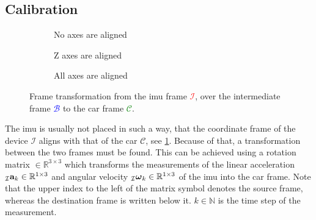 \subsection{Calibration}
\label{ssec:calibration_imu}
\begin{figure}[htb]
    \centering
    \begin{subfigure}[b]{0.3\textwidth}
        \centering
        
        \caption{No axes are aligned}
        \label{fig:tikz_frame_transformation_init}
    \end{subfigure}
    \hfill
    \begin{subfigure}[b]{0.3\textwidth}
        \centering
        
        \caption{Z axes are aligned}
        \label{fig:tikz_frame_transformation_intermediate}
    \end{subfigure}
    \hfill
    \begin{subfigure}[b]{0.3\textwidth}
        \centering
        
        \caption{All axes are aligned}
        \label{fig:tikz_frame_transformation_final}
    \end{subfigure}
    \caption[Frame transformation]{Frame transformation from the \gls{imu} frame \textcolor{red}{$\mathcal{I}$}, over the intermediate frame \textcolor{blue}{$\mathcal{B}$} to the car frame \textcolor{green}{$\mathcal{C}$}.}
    \label{fig:tikz_frame_transformation}
\end{figure}
The \gls{imu} is usually not placed in such a way, that the coordinate frame of the device $\mathcal{I}$ aligns with that of the car $\mathcal{C}$, see \cref{fig:tikz_frame_transformation_init}.
Because of that, a transformation between the two frames must be found.
This can be achieved using a rotation matrix  $\in \mathbb{R}^{3\times3}$ which transforms the measurements of the linear acceleration $\vincs{a}{I}_k \in \mathbb{R}^{1\times3}$ and angular velocity ${\vincs{\boldsymbol{\omega}}{I}_k \in \mathbb{R}^{1\times3}}$ of the \gls{imu} into the car frame.
Note that the upper index to the left of the matrix symbol denotes the source frame, whereas the destination frame is written below it.
$k \in \mathbb{N}$ is the time step of the measurement.


